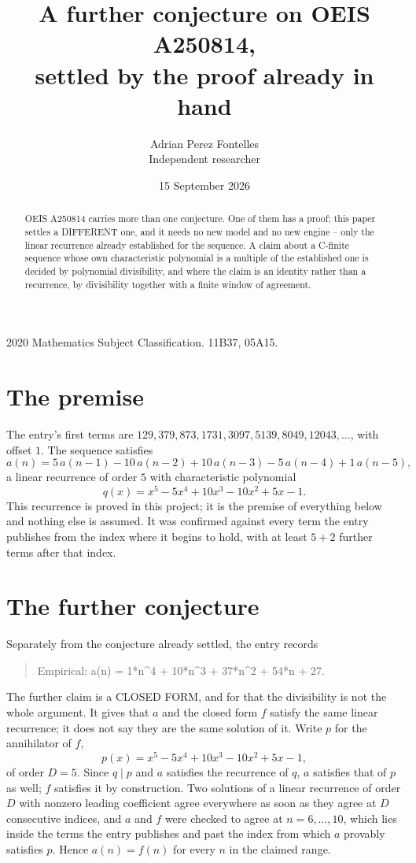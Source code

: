 \documentclass[11pt,a4paper]{article}
\title{A further conjecture on OEIS A250814,\\ \large settled by the proof already in hand}
\author{Adrian Perez Fontelles\\ \small Independent researcher}
\date{15 September 2026}
\theoremstyle{plain}
\theoremstyle{definition}
\begin{document}
\maketitle

\begin{abstract}
OEIS A250814 carries more than one conjecture. One of them has a proof; this paper settles a
DIFFERENT one, and it needs no new model and no new engine -- only the linear recurrence already
established for the sequence. A claim about a C-finite sequence whose own characteristic
polynomial is a multiple of the established one is decided by polynomial divisibility, and where
the claim is an identity rather than a recurrence, by divisibility together with a finite window
of agreement.
\end{abstract}

\noindent\small 2020 Mathematics Subject Classification. 11B37, 05A15.\normalsize

\section{The premise}

The entry's first terms are $129, 379, 873, 1731, 3097, 5139, 8049, 12043,\dots$, with offset $1$. The sequence satisfies
\[
  a(n)=5\,a(n-1) - 10\,a(n-2) + 10\,a(n-3) - 5\,a(n-4) + 1\,a(n-5) ,
\]
a linear recurrence of order $5$ with characteristic polynomial
\[
  q(x)=x^{5} - 5 x^{4} + 10 x^{3} - 10 x^{2} + 5 x - 1 .
\]
This recurrence is proved in this project; it is the premise of everything below and nothing else is assumed.
It was confirmed against every term the entry publishes from the index where it begins to hold,
with at least $5+2$ further terms after that index.

\section{The further conjecture}

Separately from the conjecture already settled, the entry records

\begin{quote}\raggedright Empirical: a(n) = 1*n\^{}4 + 10*n\^{}3 + 37*n\^{}2 + 54*n + 27.\end{quote}

The further claim is a CLOSED FORM, and for that the divisibility is not the whole argument. It
gives that $a$ and the closed form $f$ satisfy the same linear recurrence; it does not say they
are the same solution of it. Write $p$ for the annihilator of $f$,
\[
  p(x)=x^{5} - 5 x^{4} + 10 x^{3} - 10 x^{2} + 5 x - 1 ,
\]
of order $D=5$. Since $q\mid p$ and $a$ satisfies the recurrence of $q$, $a$ satisfies that of
$p$ as well; $f$ satisfies it by construction. Two solutions of a linear recurrence of order $D$
with nonzero leading coefficient agree everywhere as soon as they agree at $D$ consecutive
indices, and $a$ and $f$ were checked to agree at $n=6,\dots,10$,
which lies inside the terms the entry publishes and past the index from which $a$ provably
satisfies $p$. Hence $a(n)=f(n)$ for every $n$ in the claimed range.
\end{document}
